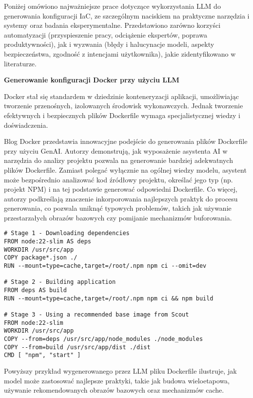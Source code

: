 Poniżej omówiono najważniejsze prace dotyczące wykorzystania LLM do generowania konfiguracji IaC, ze szczególnym naciskiem na praktyczne narzędzia i systemy oraz badania eksperymentalne. Przedstawiono zarówno korzyści automatyzacji (przyspieszenie pracy, odciążenie ekspertów, poprawa produktywności), jak i wyzwania (błędy i halucynacje modeli, aspekty bezpieczeństwa, zgodność z intencjami użytkownika), jakie zidentyfikowano w literaturze.

\textbf{Generowanie konfiguracji Docker przy użyciu LLM}

Docker stał się standardem w dziedzinie konteneryzacji aplikacji, umożliwiając tworzenie przenośnych, izolowanych środowisk wykonawczych. Jednak tworzenie efektywnych i bezpiecznych plików Dockerfile wymaga specjalistycznej wiedzy i doświadczenia.

Blog Docker przedstawia innowacyjne podejście do generowania plików Dockerfile przy użyciu GenAI. Autorzy demonstrują, jak wyposażenie asystenta AI w narzędzia do analizy projektu pozwala na generowanie bardziej adekwatnych plików Dockerfile. Zamiast polegać wyłącznie na ogólnej wiedzy modelu, asystent może bezpośrednio analizować kod źródłowy projektu, określać jego typ (np. projekt NPM) i na tej podstawie generować odpowiedni Dockerfile. Co więcej, autorzy podkreślają znaczenie inkorporowania najlepszych praktyk do procesu generowania, co pozwala uniknąć typowych problemów, takich jak używanie przestarzałych obrazów bazowych czy pomijanie mechanizmów buforowania.

\begin{lstlisting}
# Stage 1 - Downloading dependencies
FROM node:22-slim AS deps
WORKDIR /usr/src/app
COPY package*.json ./
RUN --mount=type=cache,target=/root/.npm npm ci --omit=dev

# Stage 2 - Building application
FROM deps AS build
RUN --mount=type=cache,target=/root/.npm npm ci && npm build

# Stage 3 - Using a recommended base image from Scout
FROM node:22-slim
WORKDIR /usr/src/app
COPY --from=deps /usr/src/app/node_modules ./node_modules
COPY --from=build /usr/src/app/dist ./dist
CMD [ "npm", "start" ]    
\end{lstlisting}

Powyższy przykład wygenerowanego przez LLM pliku Dockerfile ilustruje, jak model może zastosować najlepsze praktyki, takie jak budowa wieloetapowa, używanie rekomendowanych obrazów bazowych oraz mechanizmów cache.

